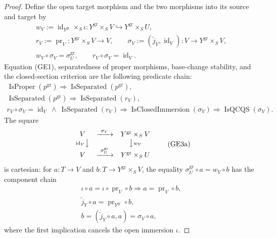 \begin{proof}
  Define the open target morphism and the two morphisms into its source and
  target by
  \[
  \begin{gathered}
    w_V:=\operatorname{id}_{Y^{\mathrm{gr}}}\times_S\iota
      \colon Y^{\mathrm{gr}}\times_SV
        \hookrightarrow Y^{\mathrm{gr}}\times_SU,\\
    r_V:=\operatorname{pr}_V\colon Y^{\mathrm{gr}}\times_SV\to V,
    \qquad
    \sigma_V:=(\widetilde j_Y,\operatorname{id}_V)
      \colon V\to Y^{\mathrm{gr}}\times_SV,\\
    w_V\circ\sigma_V=\sigma_U^{\mathrm{gr}},\qquad
    r_V\circ\sigma_V=\operatorname{id}_V.                       
  \end{gathered} \tag{GE3}
  \]
  Equation (GE1), separatedness of proper morphisms, base-change stability,
  and the closed-section criterion are the following predicate chain:
  \[
  \begin{gathered}
    \operatorname{IsProper}(p^{\mathrm{gr}})
      \Longrightarrow\operatorname{IsSeparated}(p^{\mathrm{gr}}),\\
    \operatorname{IsSeparated}(p^{\mathrm{gr}})
      \Longrightarrow\operatorname{IsSeparated}(r_V),\\
    r_V\circ\sigma_V=\operatorname{id}_V\ \wedge\
      \operatorname{IsSeparated}(r_V)
      \Longrightarrow\operatorname{IsClosedImmersion}(\sigma_V)
      \Longrightarrow\operatorname{IsQCQS}(\sigma_V).
  \end{gathered}                                                   \tag{GE3q}
  \]
  The square
  \[
  \begin{array}{ccc}
    V & \xrightarrow{\ \sigma_V\ } & Y^{\mathrm{gr}}\times_SV\\
    {\scriptstyle\operatorname{id}_V}\big\downarrow
      &&\big\downarrow{\scriptstyle w_V}\\
    V & \xrightarrow{\ \sigma_U^{\mathrm{gr}}\ }
      & Y^{\mathrm{gr}}\times_SU
  \end{array}                                                     \tag{GE3a}
  \]
  is cartesian: for $a\colon T\to V$ and
  $b\colon T\to Y^{\mathrm{gr}}\times_SV$, the equality
  $\sigma_U^{\mathrm{gr}}\circ a=w_V\circ b$ has the component chain
  \[
  \begin{gathered}
    \iota\circ a=\iota\circ\operatorname{pr}_V\circ b
      \Longrightarrow a=\operatorname{pr}_V\circ b,\\
    \widetilde j_Y\circ a
      =\operatorname{pr}_{Y^{\mathrm{gr}}}\circ b,\\
    b=(\widetilde j_Y\circ a,a)=\sigma_V\circ a,                
  \end{gathered} \tag{GE3b}
  \]
  where the first implication cancels the open immersion $\iota$.


\end{proof}
